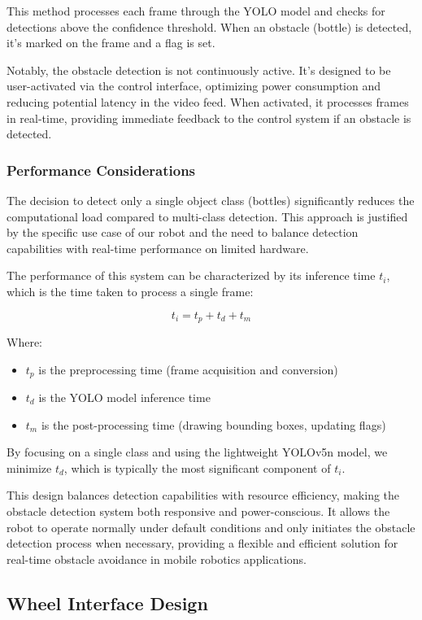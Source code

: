This method processes each frame through the YOLO model and checks for detections above the confidence threshold. When an obstacle (bottle) is detected, it's marked on the frame and a flag is set.

Notably, the obstacle detection is not continuously active. It's designed to be user-activated via the control interface, optimizing power consumption and reducing potential latency in the video feed. When activated, it processes frames in real-time, providing immediate feedback to the control system if an obstacle is detected.

\subsubsection{Performance Considerations}

The decision to detect only a single object class (bottles) significantly reduces the computational load compared to multi-class detection. This approach is justified by the specific use case of our robot and the need to balance detection capabilities with real-time performance on limited hardware.

The performance of this system can be characterized by its inference time $t_i$, which is the time taken to process a single frame:

\[
t_i = t_p + t_d + t_m
\]

Where:
\begin{itemize}
	\item $t_p$ is the preprocessing time (frame acquisition and conversion)
	\item $t_d$ is the YOLO model inference time
	\item $t_m$ is the post-processing time (drawing bounding boxes, updating flags)
\end{itemize}

By focusing on a single class and using the lightweight YOLOv5n model, we minimize $t_d$, which is typically the most significant component of $t_i$.

This design balances detection capabilities with resource efficiency, making the obstacle detection system both responsive and power-conscious. It allows the robot to operate normally under default conditions and only initiates the obstacle detection process when necessary, providing a flexible and efficient solution for real-time obstacle avoidance in mobile robotics applications.

\subsection{Wheel Interface Design}

